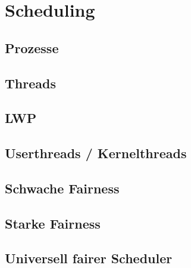 \section{Scheduling}

\subsection{Prozesse}

\subsection{Threads}

\subsection{LWP}

\subsection{Userthreads / Kernelthreads}

\subsection{Schwache Fairness}

\subsection{Starke Fairness}

\subsection{Universell fairer Scheduler}

